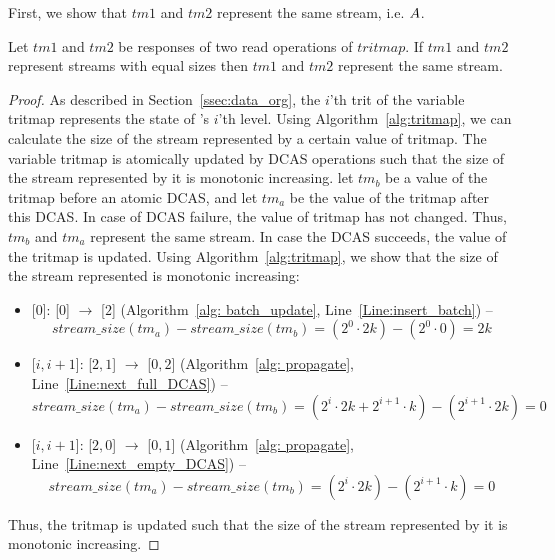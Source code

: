First, we show that $tm1$ and $tm2$ represent the same stream, i.e.  $\mathnormal{A}$.

\begin{lemma}
Let $tm1$ and $tm2$ be responses of two read operations of $tritmap$.
If $tm1$ and $tm2$ represent streams with equal sizes then $tm1$ and $tm2$ represent the same stream.
\end{lemma}
\begin{proof}
As described in Section~\ref{ssec:data_org}, the $i$'th trit of the variable tritmap represents the state of \mysketch's $i$'th level. Using Algorithm~\ref{alg:tritmap}, we can calculate the size of the stream represented by a certain value of tritmap. 
The variable tritmap is atomically updated by DCAS operations such that the size of the stream represented by it is monotonic increasing.
let $tm_b$ be a value of the tritmap before an atomic DCAS, and let $tm_a$ be the value of the tritmap after this DCAS. In case of DCAS failure, the value of tritmap has not changed. Thus, $tm_b$ and $tm_a$ represent the same stream. 
In case the DCAS succeeds, the value of the tritmap is updated. Using Algorithm~\ref{alg:tritmap}, we show that the size of the stream represented is monotonic increasing:
\begin{itemize}
  \item {}[$0$]: [$0$] $\to$ [$2$] (Algorithm~\ref{alg: batch_update}, Line~\ref{Line:insert_batch}) -- 
  \begin{equation*}
      stream\_size(tm_a) - stream\_size(tm_b) = (2^0\cdot 2k) -  (2^{0}\cdot 0) = 2k
  \end{equation*}
  \item {}[$i,i+1$]:  [$2,1$] $\to$ [$0,2$] (Algorithm~\ref{alg: propagate}, Line~\ref{Line:next_full_DCAS}) --
    \begin{equation*}
      stream\_size(tm_a) - stream\_size(tm_b) = (2^i\cdot 2k + 2^{i+1}\cdot k) -  (2^{i+1}\cdot 2k) = 0
    \end{equation*}
  \item {}[$i,i+1$]: [$2,0$] $\to$ [$0,1$] (Algorithm~\ref{alg: propagate}, Line~\ref{Line:next_empty_DCAS}) --
    \begin{equation*}
      stream\_size(tm_a) - stream\_size(tm_b) = (2^i\cdot 2k) -  (2^{i+1}\cdot k) = 0
    \end{equation*}
\end{itemize}
Thus, the tritmap is updated such that the size of the stream represented by it is monotonic increasing.
\end{proof}

